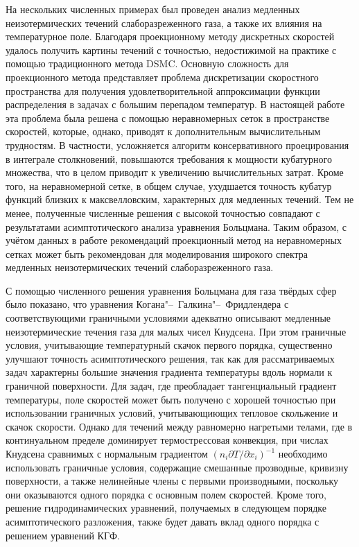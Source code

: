 \documentclass[
aps,%
12pt,%
final,%
notitlepage,%
oneside,%
onecolumn,%
nobibnotes,%
nofootinbib,%
superscriptaddress,%
noshowpacs,%
showkeys,%
floatfix,%
tightenlines,%
centertags]%
{revtex4}
\newcommand{\Pder}[2][]{\partial#1/\partial#2}
\begin{document}
На нескольких численных примерах был проведен анализ медленных неизотермических течений
слаборазреженного газа, а также их влияния на температурное поле.
Благодаря проекционному методу дискретных скоростей удалось получить картины течений
с точностью, недостижимой на практике с помощью традиционного метода DSMC.
Основную сложность для проекционного метода представляет проблема дискретизации скоростного пространства
для получения удовлетворительной аппроксимации функции распределения в задачах с большим перепадом температур.
В настоящей работе эта проблема была решена с помощью неравномерных сеток в пространстве скоростей,
которые, однако, приводят к дополнительным вычислительным трудностям.
В частности, усложняется алгоритм консервативного проецирования в интеграле столкновений,
повышаются требования к мощности кубатурного множества,
что в целом приводит к увеличению вычислительных затрат.
Кроме того, на неравномерной сетке, в общем случае, ухудшается точность кубатур
функций близких к максвелловским, характерных для медленных течений.
Тем не менее, полученные численные решения с высокой точностью совпадают с
результатами асимптотического анализа уравнения Больцмана.
Таким образом, с учётом данных в работе рекомендаций проекционный метод на неравномерных сетках
может быть рекомендован для моделирования широкого спектра медленных неизотермических течений
слаборазреженного газа.

С помощью численного решения уравнения Больцмана для газа твёрдых сфер было показано,
что уравнения Когана"--~Галкина"--~Фридлендера с соответствующими граничными условиями
адекватно описывают медленные неизотермические течения газа для малых чисел Кнудсена.
При этом граничные условия, учитывающие температурный скачок первого порядка,
существенно улучшают точность асимптотического решения, так как для рассматриваемых задач
характерны большие значения градиента температуры вдоль нормали к граничной поверхности.
Для задач, где преобладает тангенциальный градиент температуры, поле скоростей
может быть получено с хорошей точностью при использовании граничных условий,
учитывающиющих тепловое скольжение и скачок скорости.
Однако для течений между равномерно нагретыми телами, где в континуальном пределе
доминирует термострессовая конвекция, при числах Кнудсена
сравнимых с нормальным градиентом \((n_i\Pder[T]{x_i})^{-1}\)
необходимо использовать граничные условия, содержащие смешанные прозводные,
кривизну поверхности, а также нелинейные члены с первыми производными,
поскольку они оказываются одного порядка с основным полем скоростей.
Кроме того, решение гидродинамических уравнений,
получаемых в следующем порядке асимптотического разложения,
также будет давать вклад одного порядка с решением уравнений КГФ.
\end{document}
